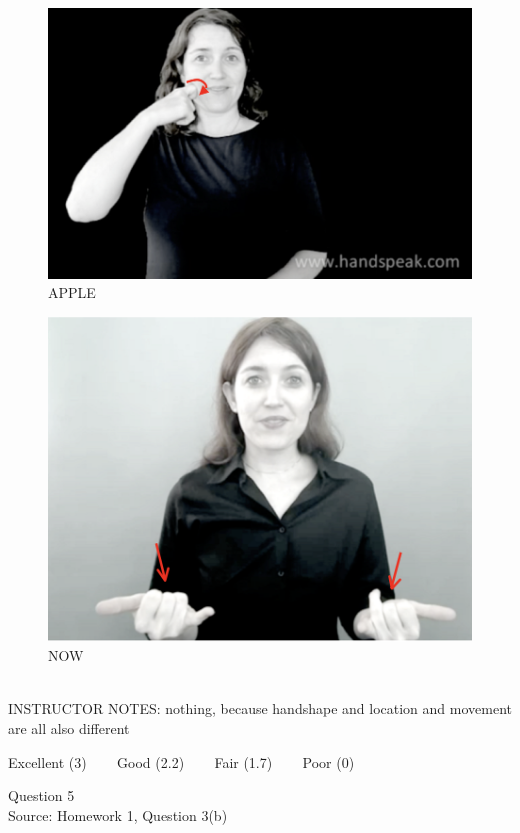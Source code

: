 \documentclass[12pt]{article}
\begin{document}
\begin{figure}[H]
\includegraphics{../images/asl_apple.png}
\caption{APPLE}
\end{figure}
\begin{figure}[H]
\includegraphics{../images/asl_now.png}
\caption{NOW}
\end{figure}

~\\
INSTRUCTOR NOTES: nothing, because handshape and location and movement are all also different


\vfill
Excellent (3) ~~~ Good (2.2) ~~~ Fair (1.7) ~~~ Poor (0)
\newpage

{\large Question 5}\\

Source: Homework 1, Question 3(b)\\
\end{document}
